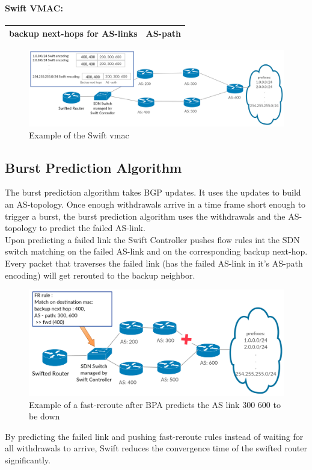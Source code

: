 \paragraph{\label{chapter2:Swift:Swift vmac}Swift VMAC:}

\begin{tabular}{|r|l|}
  \hline 
  backup next-hops for AS-links & AS-path \\
  \hline
\end{tabular}


\begin{figure}[h]
\center
\includegraphics[scale = 0.24]{Figures/bckgrnd_swift_topology.pdf}
\caption{Example of the Swift vmac}
\end{figure}


\subsection{\label{chapter2:Swift:burst prediciton algorithm}Burst Prediction Algorithm}
The burst prediction algorithm takes BGP updates. It uses the updates to build an AS-topology. Once enough withdrawals arrive in a time frame short enough to trigger a burst, the burst prediction algorithm uses the withdrawals and the AS-topology to predict the failed AS-link. \\
Upon predicting a failed link the Swift Controller pushes flow rules int the SDN switch matching on the failed AS-link and on the corresponding backup next-hop. \\
Every packet that traverses the failed link (has the failed AS-link in it's AS-path encoding) will get rerouted to the backup neighbor.
\begin{figure}[h]
\center
\includegraphics[scale = 0.36]{Figures/bckgrnd_swift_fr.pdf}
\caption{Example of a fast-reroute after BPA predicts the AS link 300 600 to be down}
\end{figure}

By predicting the failed link and pushing fast-reroute rules instead of waiting for all withdrawals to arrive, Swift reduces the convergence time of the swifted router significantly.





